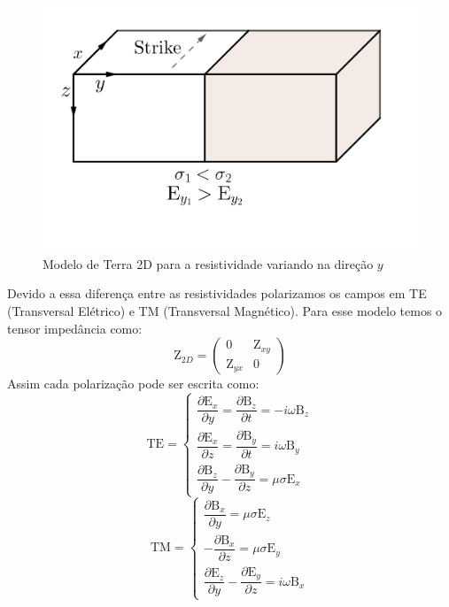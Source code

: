 	    \begin{figure}[h]
	        \caption{Modelo de Terra 2D para a resistividade variando na direção $y$}
	        \begin{center}
	        \includegraphics[width=12cm]{texto/fig/Tm_Te.png} 
	        \end{center}
		\label{fig_strike}
	    \end{figure}
	    Devido a essa diferença entre as resistividades polarizamos os campos em TE (Transversal Elétrico) e TM (Transversal Magnético).
	    Para esse modelo temos o tensor impedância como:
	    \begin{equation}
	     \textrm{Z}_{2D} = \left (\begin{array}{cc}
	                               0 & \textrm{Z}_{xy} \\
	                               \textrm{Z}_{yx} & 0
	                              \end{array} \right)
	    \end{equation}
	    Assim cada polarização pode ser escrita como:
	    \begin{equation}
	     \textrm{TE} = \left \{ \begin{array}{l}
	            \dfrac{\partial \textrm{E}_x}{\partial y} = \dfrac{\partial \textrm{B}_z}{\partial t} = -i\omega \textrm{B}_z \\
	           \dfrac{\partial \textrm{E}_x}{\partial z} = \dfrac{\partial \textrm{B}_y}{\partial t} = i\omega \textrm{B}_y \\
	           \dfrac{\partial \textrm{B}_z}{\partial y} - \dfrac{\partial \textrm{B}_y}{\partial z} = \mu \sigma \textrm{E}_x 
	           \end{array} \right.
	    \end{equation}
	    \begin{equation}
	     \textrm{TM} = \left \{ \begin{array}{l}
	            \dfrac{\partial \textrm{B}_x}{\partial y} = \mu \sigma \textrm{E}_z \\
	           -\dfrac{\partial \textrm{B}_x}{\partial z} = \mu \sigma \textrm{E}_y \\
	           \dfrac{\partial \textrm{E}_z}{\partial y} - \dfrac{\partial \textrm{E}_y}{\partial z} = i \omega \textrm{B}_x 
	           \end{array} \right.
	    \end{equation}
        
